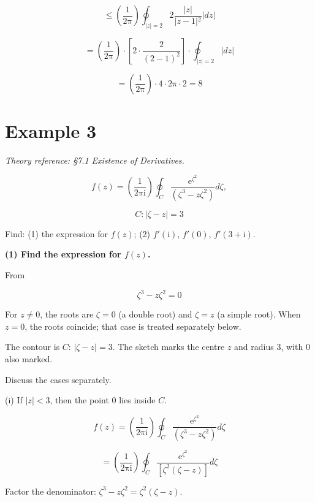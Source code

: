 \documentclass[11pt,a4paper]{article}
\theoremstyle{definition}
\theoremstyle{plain}
\begin{document}
\[
\le \left(\frac{1}{2\mathrm{\pi}}\right)\oint_{\vert{}z\vert{} = 2}2\frac{\vert{}z\vert{}}{\vert{}z - 1\vert{}^{2}}\vert{}dz\vert{}
\]

\[
= \left(\frac{1}{2\mathrm{\pi}}\right) \cdot[2 \cdot \frac{2}{(2 - 1)^{2}}] \cdot \oint_{\vert{}z\vert{} = 2}\vert{}dz\vert{}
\]

\[
= \left(\frac{1}{2\mathrm{\pi}}\right) \cdot 4 \cdot 2\mathrm{\pi} \cdot 2 = 8
\]

\section*{Example 3}

\textit{Theory reference: §7.1 Existence of Derivatives.}

\begin{equation}
f(z) = \left(\frac{1}{2\mathrm{\pi}\mathrm{i}}\right)\oint_{C}\frac{\mathrm{e}^{\zeta^{2}}}{(\zeta^{3} - z\zeta^{2})}d\zeta,
\end{equation}

\[
C:\vert{}\zeta - z\vert{} = 3
\]

Find: (1) the expression for $f(z)$; (2) $f'(\mathrm{i})$, $f'(0)$, $f'(3 + \mathrm{i})$.

\textbf{(1) Find the expression for $f(z)$.}

From

\begin{equation}
\zeta^{3} - z\zeta^{2} = 0
\end{equation}

For $z \ne 0$, the roots are $\zeta = 0$ (a double root) and $\zeta = z$ (a simple root). When $z = 0$, the roots coincide; that case is treated separately below.

The contour is $C$: $\vert{}\zeta - z\vert{} = 3$. The sketch marks the centre $z$ and radius 3, with 0 also marked.

Discuss the cases separately.

(i) If $\vert{}z\vert{} < 3$, then the point 0 lies inside $C$.

\begin{equation}
f(z) = \left(\frac{1}{2\mathrm{\pi}\mathrm{i}}\right)\oint_{C}\frac{\mathrm{e}^{\zeta^{2}}}{(\zeta^{3} - z\zeta^{2})}d\zeta
\end{equation}

\[
= \left(\frac{1}{2\mathrm{\pi}\mathrm{i}}\right)\oint_{C}\frac{\mathrm{e}^{\zeta^{2}}}{[\zeta^{2}(\zeta - z)]}d\zeta
\]

Factor the denominator: $\zeta^{3} - z\zeta^{2} = \zeta^{2}(\zeta - z)$.
\end{document}
